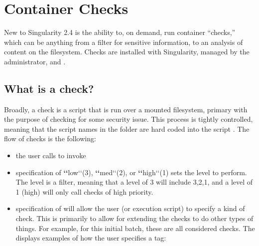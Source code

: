 \documentclass[letterpaper,10pt,english]{sphinxmanual}
\begin{document}
%
\begin{sphinxVerbatim}[commandchars=\\\{\}]

\end{sphinxVerbatim}


\chapter{Container Checks}
\label{\detokenize{container_checks:container-checks}}\label{\detokenize{container_checks::doc}}
New to Singularity 2.4 is the ability to, on demand, run container
“checks,” which can be anything from a filter for sensitive information,
to an analysis of content on the filesystem. Checks are installed with
Singularity, managed by the administrator, and .


\section{What is a check?}
\label{\detokenize{container_checks:what-is-a-check}}
Broadly, a check is a script that is run over a mounted filesystem,
primary with the purpose of checking for some security issue. This
process is tightly controlled, meaning that the script names in the
folder are hard coded into the script
.
The flow of checks is the following:
\begin{itemize}
\item {} 
the user calls  to invoke

\item {} 
specification of {\color{red}\bfseries{}{}`{}`}\textendash{}low{}`{}`(3), {\color{red}\bfseries{}{}`{}`}\textendash{}med{}`{}`(2), or {\color{red}\bfseries{}{}`{}`}\textendash{}high{}`{}`(1) sets the level to perform. The
level is a filter, meaning that a level of 3 will include 3,2,1, and
a level of 1 (high) will only call checks of high priority.

\item {} 
specification of  will allow the user (or execution script) to specify
a kind of check. This is primarily to allow for extending the checks
to do other types of things. For example, for this initial batch,
these are all considered  checks. The
displays examples of how the user specifies a tag:

\end{itemize}
\end{document}

